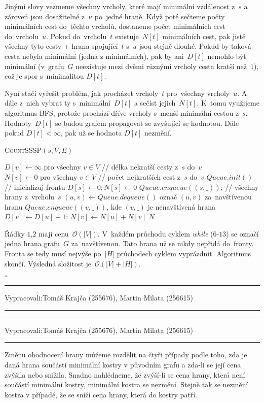\documentclass[12pt]{article}
\newcommand{\la}{\leftarrow}
\renewcommand{\O}{\mathcal{O}}
\newcommand{\zadani}[2]{
{\large
\noindent {\bf IB108 \hfill{} Sada #1, Příklad #2 \\[-4mm]}
\noindent\hrule
\vspace{2mm}
\noindent Vypracovali:\hfill{}Tomáš Krajča (255676), Martin Milata (256615)
\vspace{3mm}
\hrule
\bigskip\bigskip}
}
\begin{document}
\noindent
Jinými slovy vezmeme všechny vrcholy, které mají minimální vzdálenost z~$s$ a
zároveň jsou dosažitelné z~$u$ po~jedné hraně. Když poté sečteme počty
minimálních cest do~těchto vrcholů, dostaneme počet minimálních cest do~vrcholu~$u$. Pokud do~vrcholu~$t$ existuje~$N[t]$ minimálních cest, pak jistě všechny
tyto cesty + hrana spojující~$t$ s~$u$ jsou stejně dlouhé. Pokud by taková cesta
nebyla minimální (jedna z minimálních), pak by ani~$D[t]$ nemohlo být minimální
(v~grafu~$G$ neexistuje mezi dvěmi různými vrcholy cesta kratší než~$1$), což je
spor s~minimalitou $D[t]$.

\noindent
Nyní stačí vyřešit problém, jak procházet vrcholy~$t$ pro~všechny vrcholy~$u$. A dále z~nich vybrat ty s~minimální~$D[t]$ a sečíst jejich~$N[t]$. K~tomu
využijeme algoritmus \textsc{BFS}, protože prochází dříve vrcholy s~menší
minimální cestou z~$s$. Hodnoty~$D[t]$ se budou grafem propagovat se
zvyšující se hodnotou. Dále pokud $D[t] < \infty$, pak už se hodnota $D[t]$ nezmění.

\begin{algorithm}
\textsc{CountSSSP}$(s, V, E)$
\begin{algorithmic}[1]
\STATE $D[v] \la \infty \mbox{ pro všechny } v \in V$ // délka nekratší cesty z~$s$ do~$v$
\STATE $N[v] \la 0 \mbox{ pro všechny } v \in V$ // počet nejkratších cest z~$s$ do~$v$
\STATE $Queue.init()$ // inicializuj frontu
\STATE $D[s] \la 0; N[s] \la 0$
\STATE $Queue.enqueue((s,\_))$; // všechny hrany z~vrcholu~$s$
\STATE $(u,v) \la Queue.dequeue()$
\STATE označ $(u,v)$ za~navštívenou hranu
\STATE $Queue.enqueue((v,\_)) \mbox{, kde } (v,\_)$ je nenavštívená hrana
\STATE $D[v] \la D[u]+1$; $N[v] \la N[u] + N[v]$
\ENDIF
\ENDWHILE
\RETURN $N$
\end{algorithmic}
\end{algorithm}
Řádky $1$,$2$ mají cenu~$\O(|V|)$. V~každém průchodu cyklem
\textit{while} ($6$-$13$) se označí jedna hrana grafu~$G$ za~navštívenou. Tato
hrana už se nikdy nepřidá do~fronty. Fronta se tedy musí nejvýše po~$|H|$
průchodech cyklem vyprázdnit. Algoritmus skončí. Výsledná složitost je~$\O(|V|+|H|)$.

\hfill$\square$

\clearpage
\zadani{3}{3}

\clearpage
\zadani{3}{4}

\noindent
Změnu ohodnocení hrany můžeme rozdělit na čtyři případy podle toho, zda je daná hrana součástí
minimální kostry v původním grafu a zda-li se její cena zvýšila nebo snížila.  Snadno nahlédneme, že
zvýší-li se cena hrany, která není součástí minimální kostry, minimální kostra se nezmění. Stejně
tak se nezmění kostra v případě, že se sníží cena hrany, která do kostry patří.
\end{document}
